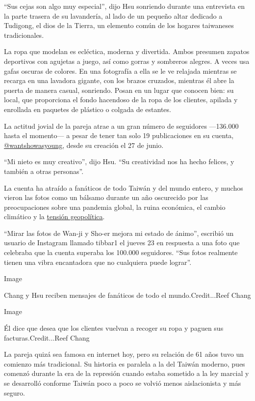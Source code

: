``Sus cejas son algo muy especial'', dijo Hsu sonriendo durante una
entrevista en la parte trasera de su lavandería, al lado de un pequeño
altar dedicado a Tudigong, el dios de la Tierra, un elemento común de
los hogares taiwaneses tradicionales.

La ropa que modelan es ecléctica, moderna y divertida. Ambos presumen
zapatos deportivos con agujetas a juego, así como gorras y sombreros
alegres. A veces usa gafas oscuras de colores. En una fotografía a ella
se le ve relajada mientras se recarga en una lavadora gigante, con los
brazos cruzados, mientras él abre la puerta de manera casual, sonriendo.
Posan en un lugar que conocen bien: su local, que proporciona el fondo
hacendoso de la ropa de los clientes, apilada y enrollada en paquetes de
plástico o colgada de estantes.

La actitud jovial de la pareja atrae a un gran número de seguidores
---136.000 hasta el momento--- a pesar de tener tan solo 19
publicaciones en su cuenta,
\href{https://www.instagram.com/wantshowasyoung/?hl=en}{@wantshowasyoung},
desde su creación el 27 de junio.

``Mi nieto es muy creativo'', dijo Hsu. ``Su creatividad nos ha hecho
felices, y también a otras personas''.

La cuenta ha atraído a fanáticos de todo Taiwán y del mundo entero, y
muchos vieron las fotos como un bálsamo durante un año oscurecido por
las preocupaciones sobre una pandemia global, la ruina económica, el
cambio climático y la
\href{https://www.nytimes3xbfgragh.onion/2020/07/01/world/asia/taiwan-china-hong-kong.html?searchResultPosition=1}{tensión
geopolítica}.

``Mirar las fotos de Wan-ji y Sho-er mejora mi estado de ánimo'',
escribió un usuario de Instagram llamado tibbar1 el jueves 23 en
respuesta a una foto que celebraba que la cuenta superaba los 100.000
seguidores. ``Sus fotos realmente tienen una vibra encantadora que no
cualquiera puede lograr''.

Image

Chang y Hsu reciben mensajes de fanáticos de todo el mundo.Credit...Reef
Chang

Image

Él dice que desea que los clientes vuelvan a recoger su ropa y paguen
sus facturas.Credit...Reef Chang

La pareja quizá sea famosa en internet hoy, pero su relación de 61 años
tuvo un comienzo más tradicional. Su historia es paralela a la del
Taiwán moderno, pues comenzó durante la era de la represión cuando
estaba sometido a la ley marcial y se desarrolló conforme Taiwán poco a
poco se volvió menos aislacionista y más seguro.

